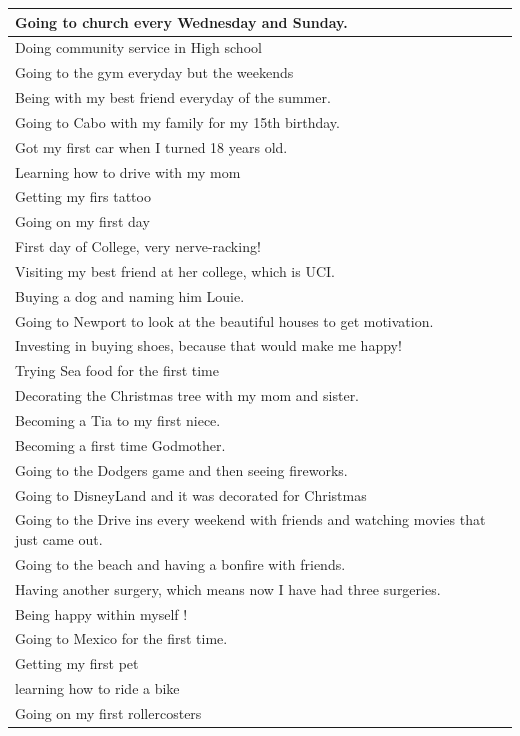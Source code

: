 \documentclass[
  .7em,
  letterpaper,
  DIV=11,
  numbers=noendperiod]{scrartcl}
\begin{document}
\begin{table}
\begin{tabular}{l}
\hline
Going to church every Wednesday and Sunday.\\
\hline
Doing community service in High school\\
\hline
Going to the gym everyday but the weekends\\
\hline
Being with my best friend everyday of the summer.\\
\hline
Going to Cabo with my family for my 15th birthday.\\
\hline
Got my first car when I turned 18 years old.\\
\hline
Learning how to drive with my mom\\
\hline
Getting my firs tattoo\\
\hline
Going on my first day\\
\hline
First day of College, very nerve-racking!\\
\hline
Visiting my best friend at her college, which is UCI.\\
\hline
Buying a dog and naming him Louie.\\
\hline
Going to Newport to look at the beautiful houses to get motivation.\\
\hline
Investing in buying shoes, because that would make me happy!\\
\hline
Trying Sea food for the first time\\
\hline
Decorating the Christmas tree with my mom and sister.\\
\hline
Becoming a Tia to my first niece.\\
\hline
Becoming a first time Godmother.\\
\hline
Going to the Dodgers game and then seeing fireworks.\\
\hline
Going to DisneyLand and it was decorated for Christmas\\
\hline
Going to the Drive ins every weekend with friends and watching movies that just came out.\\
\hline
Going to the beach and having a bonfire with friends.\\
\hline
Having another surgery, which means now I have had three surgeries.\\
\hline
Being happy within myself !\\
\hline
Going to Mexico for the first time.\\
\hline
Getting my first pet\\
\hline
learning how to ride a bike\\
\hline
Going on my first rollercosters\\

\end{tabular}
\end{table}
\end{document}
